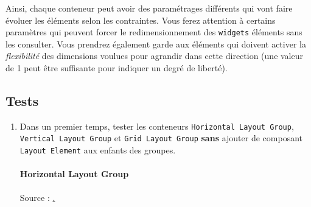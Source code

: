 \documentclass[a4paper,10pt]{article}
\newenvironment{solution}%
{\begin{tcolorbox}[breakable,colback=red!5!white,colframe=red!75!black,title=Solution]}%
{\end{tcolorbox}}
\begin{document}
Ainsi, chaque conteneur peut avoir des paramétrages différents qui vont faire évoluer les éléments selon les contraintes. Vous ferez attention à certains paramètres qui peuvent forcer le redimensionnement des \texttt{widgets} éléments sans les consulter. Vous prendrez également garde aux éléments qui doivent activer la \textit{flexibilité} des dimensions voulues pour agrandir dans cette direction (une valeur de 1 peut être suffisante pour indiquer un degré de liberté).

\subsection*{Tests}

\begin{enumerate}
	\item Dans un premier temps, tester les conteneurs \texttt{Horizontal Layout Group}, \texttt{Vertical Layout Group} et \texttt{Grid Layout Group} \textbf{sans} ajouter de composant \texttt{Layout Element} aux enfants des groupes.
	
\ifversionenseignant
\begin{solution}
	\paragraph{Horizontal Layout Group}
	
	Source : \href{https://docs.unity3d.com/Packages/com.unity.ugui@2.5/manual/script-HorizontalLayoutGroup.html}.
	

\end{solution}
\end{enumerate}
\end{document}
